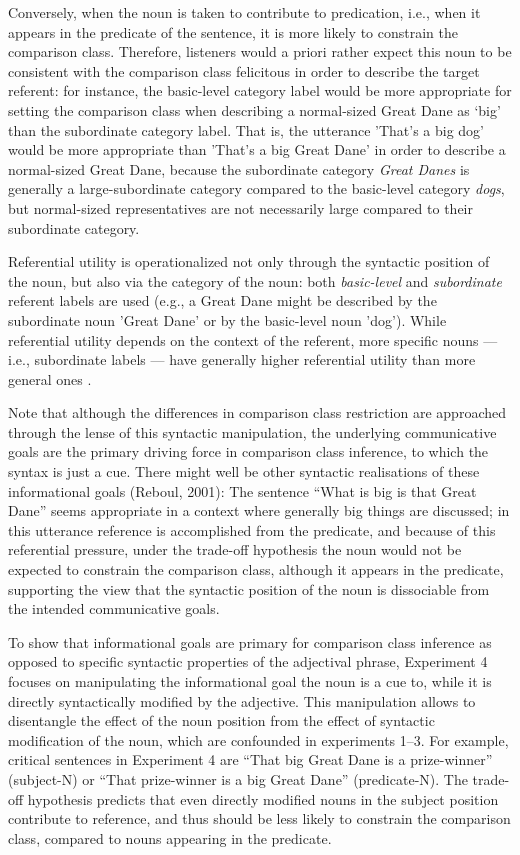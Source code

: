  Conversely, when the noun is taken to contribute to predication, i.e., when it appears in the predicate of the sentence, it is more likely to constrain the comparison class. Therefore, listeners would a priori rather expect this noun to be consistent with the comparison class felicitous in order to describe the target referent: for instance, the basic-level category label would be more appropriate for setting the comparison class when describing a normal-sized Great Dane as ‘big’ than the subordinate category label. That is, the utterance 'That's a big dog' would be more appropriate than 'That's a big Great Dane' in order to describe a normal-sized Great Dane, because the subordinate category \emph{Great Danes} is generally a large-subordinate category compared to the basic-level category \emph{dogs}, but normal-sized representatives are not necessarily large compared to their subordinate category. 

Referential utility is operationalized not only through the syntactic position of the noun, but also via the category of the noun: both \emph{basic-level} and \emph{subordinate} referent labels are used (e.g., a Great Dane might be described by the subordinate noun 'Great Dane' or by the basic-level noun 'dog'). While referential utility depends on the context of the referent, more specific nouns --- i.e., subordinate labels --- have generally higher referential utility than more general ones \parencite{graf2016animal}. 

Note that although the differences in comparison class restriction are approached through the lense of this syntactic manipulation, the underlying communicative goals are the primary driving force in comparison class inference, to which the syntax is just a cue. 
There might well be other syntactic realisations of these informational goals (Reboul, 2001): The sentence “What is big is that Great Dane” seems appropriate in a context where generally big things are discussed; in this utterance reference is accomplished from the predicate, and because of this referential pressure, under the trade-off hypothesis the noun would not be expected to constrain the comparison class, although it appears in the predicate, supporting the view that the syntactic position of the noun is dissociable from the intended communicative goals.

To show that informational goals are primary for comparison class inference as opposed to specific syntactic properties of the adjectival phrase, Experiment 4 focuses on manipulating the informational goal the noun is a cue to, while it is directly syntactically modified by the adjective. This manipulation allows to disentangle the effect of the noun position from the effect of syntactic modification of the noun, which are confounded in experiments 1--3. For example, critical sentences in Experiment 4 are “That big Great Dane is a prize-winner” (subject-N) or “That prize-winner is a big Great Dane” (predicate-N). The trade-off hypothesis predicts that even directly modified nouns in the subject position contribute to reference, and thus should be less likely to constrain the comparison class, compared to nouns appearing in the predicate.


